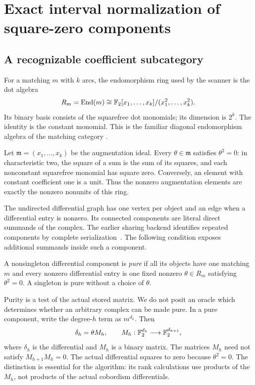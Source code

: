\section{Exact interval normalization of square-zero components}
\label{sec:interval-normalization}

\subsection{A recognizable coefficient subcategory}

For a matching $m$ with $k$ arcs, the endomorphism ring used by the scanner
is the dot algebra
\begin{equation}\label{eq:dot-algebra}
 R_m=\operatorname{End}(m)\cong
 \mathbb F_2[x_1,\ldots,x_k]/(x_1^2,\ldots,x_k^2).
\end{equation}
Its binary basis consists of the squarefree dot monomials; its dimension
is $2^k$. The identity is the constant monomial. This is the familiar
diagonal endomorphism algebra of the matching category
\cite{khovanov,barnatan}.

Let $\mathfrak m=(x_1,\ldots,x_k)$ be the augmentation ideal. Every
$\theta\in\mathfrak m$ satisfies $\theta^2=0$: in characteristic two,
the square of a sum is the sum of its squares, and each nonconstant
squarefree monomial has square zero. Conversely, an element with constant
coefficient one is a unit. Thus the nonzero augmentation elements are
exactly the nonzero nonunits of this ring.

The undirected differential graph has one vertex per object and an edge
when a differential entry is nonzero. Its connected components are
literal direct summands of the complex. The earlier sharing backend
identifies repeated components by complete serialization~\cite{prior}.
The following condition exposes additional summands inside such a
component.

\begin{definition}\label{def:pure}
A nonsingleton differential component is \emph{pure} if all its objects
have one matching $m$ and every nonzero differential entry is one fixed
nonzero $\theta\in R_m$ satisfying $\theta^2=0$. A singleton is pure
without a choice of $\theta$.
\end{definition}

Purity is a test of the actual stored matrix. We do not posit an oracle
which determines whether an arbitrary complex can be made pure. In a pure
component, write the degree-$h$ term as $m^{d_h}$. Then
\begin{equation}\label{eq:theta-matrix}
 \delta_h=\theta M_h,\qquad
 M_h:\mathbb F_2^{d_h}\longrightarrow\mathbb F_2^{d_{h+1}},
\end{equation}
where $\delta_h$ is the differential and $M_h$ is a binary matrix.
The matrices $M_h$ need not satisfy
$M_{h+1}M_h=0$. The actual differential squares to zero because
$\theta^2=0$. The distinction is essential for the algorithm: its rank
calculations use products of the $M_h$, not products of the actual
cobordism differentials.

